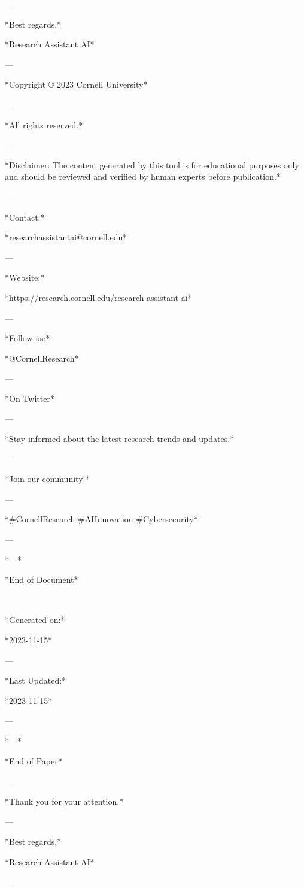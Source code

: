 --- 

*Best regards,* 

*Research Assistant AI* 

--- 

*Copyright © 2023 Cornell University* 

--- 

*All rights reserved.* 

--- 

*Disclaimer: The content generated by this tool is for educational purposes only and should be reviewed and verified by human experts before publication.* 

--- 

*Contact:* 

*researchassistantai@cornell.edu* 

--- 

*Website:* 

*https://research.cornell.edu/research-assistant-ai* 

--- 

*Follow us:* 

*@CornellResearch* 

--- 

*On Twitter* 

--- 

*Stay informed about the latest research trends and updates.* 

--- 

*Join our community!* 

--- 

*#CornellResearch #AIInnovation #Cybersecurity* 

--- 

*---* 

*End of Document* 

--- 

*Generated on:* 

*2023-11-15* 

--- 

*Last Updated:* 

*2023-11-15* 

--- 

*---* 

*End of Paper* 

--- 

*Thank you for your attention.* 

--- 

*Best regards,* 

*Research Assistant AI* 

--- 

